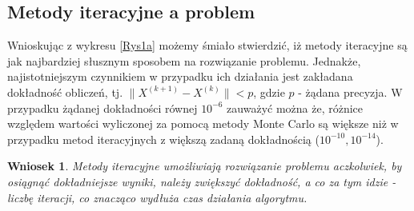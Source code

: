 \documentclass[10pt]{article}
\newtheorem{wn}{Wniosek}
\begin{document}
\subsection{Metody iteracyjne a problem}
Wnioskując z wykresu \ref{Rys1a} możemy śmiało stwierdzić, iż metody iteracyjne są jak najbardziej słusznym sposobem na rozwiązanie problemu. Jednakże, najistotniejszym czynnikiem w przypadku ich działania jest zakładana dokładność obliczeń, tj. $\|{X^{(k+1)}-X^{(k)}}\| < p$, gdzie $p$ - żądana precyzja.
W przypadku żądanej dokładności równej $10^{-6}$ zauważyć można że, różnice względem wartości wyliczonej za pomocą metody Monte Carlo są większe niż w przypadku metod iteracyjnych z większą zadaną dokładnością ($10^{-10}, 10^{-14}$).
\begin{wn}
	Metody iteracyjne umożliwiają rozwiązanie problemu aczkolwiek, by osiągnąć dokładniejsze wyniki, należy zwiększyć dokładność, a co za tym idzie - liczbę iteracji, co znacząco wydłuża czas działania algorytmu. \label{wn:1}
\end{wn}
\end{document}
